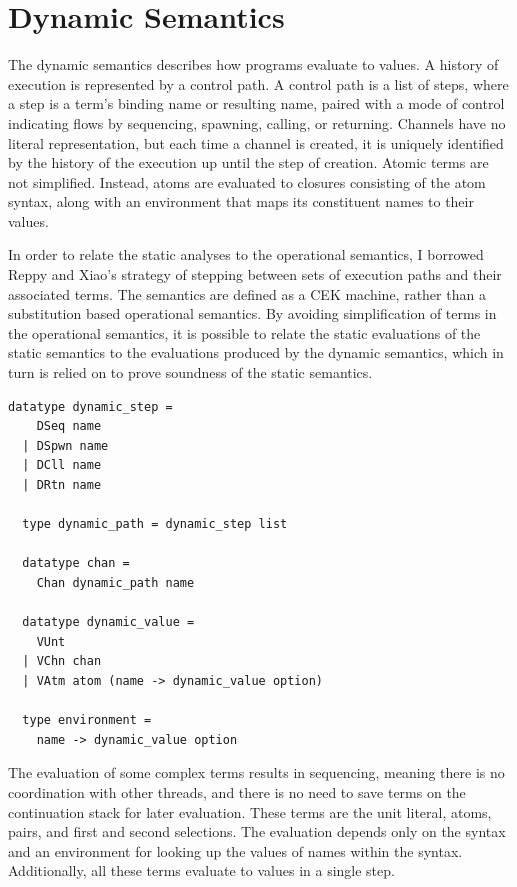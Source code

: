 \documentclass[letterpaper, 11pt]{report}
\begin{document}
\section{Dynamic Semantics}
The dynamic semantics describes how programs evaluate to values.
A history of execution is represented by a control path.
A control path is a list of steps, where a step is a term's 
binding name or resulting name, paired with a mode of control indicating
flows by sequencing, spawning, calling, or returning.
Channels have no literal representation, but each
time a channel is created, it is uniquely identified by the history of the execution up until
the step of creation. Atomic terms are not simplified. Instead, atoms are evaluated to
closures consisting of the atom syntax, along with an environment that maps its
constituent names to their values.

In order to relate the static analyses to the operational semantics, I
borrowed Reppy and Xiao's strategy of stepping between sets of execution paths and
their associated terms.
The semantics are defined as a CEK machine, rather than a
substitution based operational semantics. By avoiding simplification of terms in the
operational semantics, it is possible to relate
the static evaluations of the static semantics to the
evaluations produced by the dynamic semantics,
which in turn is relied on to prove soundness of the static semantics.


\begin{lstlisting}[language=logic]
  datatype dynamic_step =
    DSeq name
  | DSpwn name
  | DCll name
  | DRtn name 

  type dynamic_path = dynamic_step list

  datatype chan =
    Chan dynamic_path name 

  datatype dynamic_value = 
    VUnt
  | VChn chan
  | VAtm atom (name -> dynamic_value option)

  type environment =
    name -> dynamic_value option
\end{lstlisting}

The evaluation of some complex terms results in sequencing, meaning there is no coordination
with other threads, and there is no need to save terms on
the continuation stack for later evaluation. These terms are the
unit literal, atoms, pairs, and first and second selections. The evaluation depends only
on the syntax and an environment for looking up the values of names within the syntax.
Additionally, all these terms evaluate to values in a single step.
\end{document}
